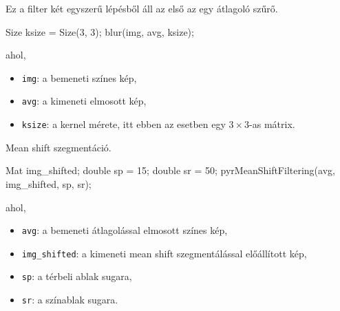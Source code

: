 
Ez a filter két egyszerű lépésből áll az első az egy átlagoló szűrő.
\begin{cpp}
Size ksize = Size(3, 3);
blur(img, avg, ksize);
\end{cpp}
ahol,
\begin{itemize}
    \item \texttt{img}: a bemeneti színes kép,
    \item \texttt{avg}: a kimeneti elmosott kép,
    \item \texttt{ksize}: a kernel mérete, itt ebben az esetben egy $3 \times 3$-as mátrix.
\end{itemize}
Mean shift szegmentáció.
\begin{cpp}
Mat img_shifted;
double sp = 15;
double sr = 50;
pyrMeanShiftFiltering(avg, img_shifted, sp, sr);
\end{cpp}
ahol,
\begin{itemize}
    \item \texttt{avg}: a bemeneti átlagolással elmosott színes kép,
    \item \texttt{img\_shifted}: a kimeneti mean shift szegmentálással előállított kép,
    \item \texttt{sp}: a térbeli ablak sugara,
    \item \texttt{sr}: a színablak sugara.
\end{itemize}



